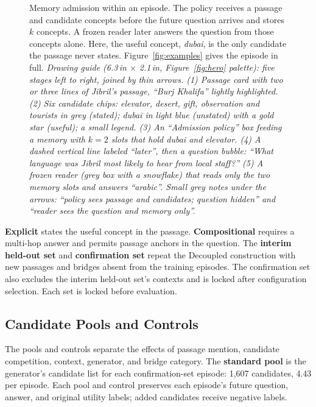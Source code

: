 \begin{figure}[t]
\centering
\figtodo{5.4cm}
\caption{Memory admission within an episode. The policy receives a
passage and candidate concepts before the future question arrives
and stores $k$ concepts. A frozen reader later answers the question
from those concepts alone. Here, the useful concept, \emph{dubai},
is the only candidate the passage never states.
Figure~\ref{fig:examples} gives the episode in full.
\textit{Drawing guide (6.3\,in $\times$ 2.1\,in, Figure~\ref{fig:hero} palette): five stages
left to right, joined by thin arrows. (1) Passage card with two or three lines of Jibril's passage,
``Burj Khalifa'' lightly highlighted. (2) Six candidate chips: elevator, desert, gift, observation and
tourists in grey (stated); dubai in light blue (unstated) with a gold star (useful); a small legend.
(3) An ``Admission policy'' box feeding a memory with $k=2$ slots that hold dubai and elevator.
(4) A dashed vertical line labeled ``later'', then a question bubble: ``What language was Jibril most
likely to hear from local staff?'' (5) A frozen reader (grey box with a snowflake) that reads only the
two memory slots and answers ``arabic''. Small grey notes under the arrows: ``policy sees passage and
candidates; question hidden'' and ``reader sees the question and memory only''.}}
\label{fig:episode}
\end{figure}

\textbf{Explicit} states the useful concept in the passage.
\textbf{Compositional} requires a multi-hop answer and permits passage
anchors in the question. The \textbf{interim held-out set} and
\textbf{confirmation set} repeat the Decoupled construction with new
passages and bridges absent from the training episodes. The
confirmation set also excludes the interim held-out set's contexts
and is locked after configuration selection. Each set is locked
before evaluation.

\subsection{Candidate Pools and Controls}

The pools and controls separate the effects of passage mention,
candidate competition, context, generator, and bridge category.
The \textbf{standard pool} is the generator's candidate list for each
confirmation-set episode: 1,607 candidates, 4.43 per episode.
Each pool and control preserves each episode's future question,
answer, and original utility labels; added candidates receive
negative labels.

